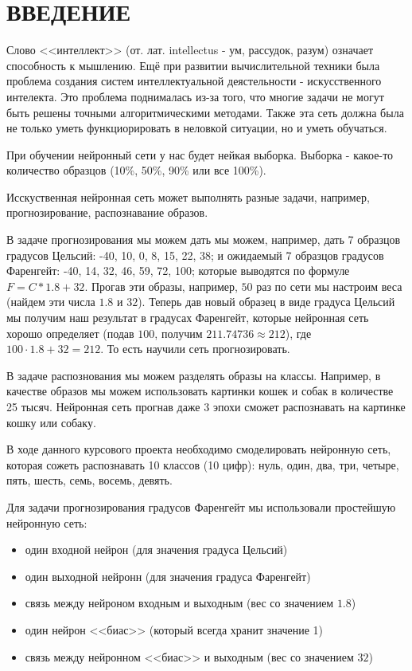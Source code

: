 \section*{ВВЕДЕНИЕ} %

Слово <<интеллект>> (от. лат. intellectus - ум, рассудок, разум) означает способность к мышлению. Ещё при развитии вычислительной техники была проблема создания систем интеллектуальной деястельности - искусственного интелекта. Это проблема поднималась из-за того, что многие задачи не могут быть решены точными алгоритмическими методами. Также эта сеть должна была не только уметь функциорировать в неловкой ситуации, но и уметь обучаться.

При обучении нейронный сети у нас будет нейкая выборка. Выборка - какое-то количество образцов (10\%, 50\%, 90\% или все 100\%).

Исскуственная нейронная сеть может выполнять разные задачи, например, прогнозирование, распознавание образов.

В задаче прогнозирования мы можем дать мы можем, например, дать 7 образцов градусов Цельсий: -40, 10, 0, 8, 15, 22, 38; и ожидаемый 7 образцов градусов Фаренгейт: -40, 14, 32, 46, 59, 72, 100; которые выводятся по формуле $F = C * 1.8 + 32$. Прогав эти образы, например, $50$ раз по сети мы настроим веса (найдем эти числа $1.8$ и $32$). Теперь дав новый образец в виде градуса Цельсий мы получим наш результат в градусах Фаренгейт, которые нейронная сеть хорошо определяет (подав $100$, получим $211.74736 \approx 212$), где $100 \cdot 1.8 + 32 = 212$. То есть научили сеть прогнозировать.

В задаче распознования мы можем разделять образы на классы. Например, в качестве образов мы можем использовать картинки кошек и собак в количестве 25 тысяч. Нейронная сеть прогнав даже 3 эпохи сможет распознавать на картинке кошку или собаку.

В ходе данного курсового проекта необходимо смоделировать нейронную сеть, которая сожеть распознавать 10 классов (10 цифр): нуль, один, два, три, четыре, пять, шесть, семь, восемь, девять.

Для задачи прогнозирования градусов Фаренгейт мы использовали простейшую нейронную сеть:

\begin{itemize}
    \item один входной нейрон (для значения градуса Цельсий)
    \item один выходной нейронн (для значения градуса Фаренгейт)
    \item связь между нейроном входным и выходным (вес со значением $1.8$)
    \item один нейрон <<биас>> (который всегда хранит значение 1)
    \item связь между нейронном <<биас>> и выходным (вес со значением $32$)
\end{itemize}

